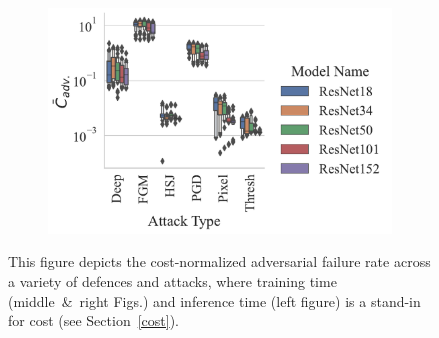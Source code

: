 \begin{figure}[h!]
\begin{subfigure}[]{0.3\textwidth}
        \centering
    \end{subfigure}
    \begin{subfigure}[]{0.35\textwidth}
        \includegraphics[width=\textwidth]{cifar100/adv_failures_per_train_time_vs_attack_type.pdf}
        \centering
    \end{subfigure}
    \caption{This figure depicts the cost-normalized adversarial failure rate across a variety of defences and attacks, where training time (middle~\&~right Figs.) and inference time (left figure) is a stand-in for cost (see Section~\ref{cost}).}
    \label{fig:cifar100_failures_per_train_time}
\end{figure}

